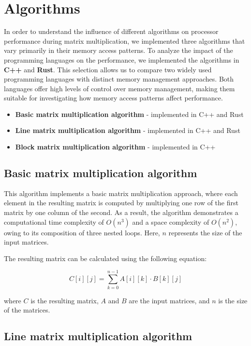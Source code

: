 \section{Algorithms}
In order to understand the influence of different algorithms on
processor performance during matrix multiplication, we implemented
three algorithms that vary primarily in their memory access patterns.
To analyze the impact of the programming languages on the performance,
we implemented the algorithms in \textbf{C++} and \textbf{Rust}. This selection allows us to compare two widely used programming languages with
distinct memory management approaches. Both
languages offer high levels of control over memory management, making
them suitable for investigating how memory access patterns affect performance.


\begin{itemize}
    \item \textbf{Basic matrix multiplication algorithm} - implemented in C++ and Rust
    \item \textbf{Line matrix multiplication algorithm} - implemented in C++ and Rust
    \item \textbf{Block matrix multiplication algorithm} - implemented in C++
\end{itemize}

\subsection{Basic matrix multiplication algorithm}

This algorithm implements a basic matrix multiplication approach,
where each element in the resulting matrix is computed by
multiplying one row of the first matrix by one
column of the second. As a result, the algorithm demonstrates a
computational time complexity of $O(n^3)$ and a space complexity
of $O(n^2)$, owing to its composition of three nested loops. Here,
$n$ represents the size of the input matrices.

The resulting matrix can be calculated using the following equation:

\begin{equation}
    C[i][j] = \sum_{k=0}^{n-1} A[i][k] \cdot B[k][j]
\end{equation}

where $C$ is the resulting matrix, $A$ and $B$ are the input matrices, and $n$ is the size of the matrices.


\subsection{Line matrix multiplication algorithm}

